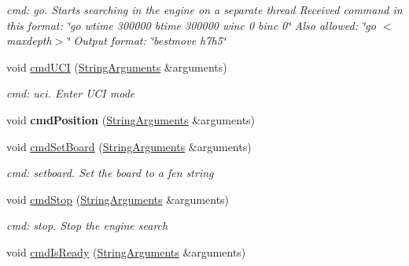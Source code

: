 \begin{DoxyCompactItemize}
\begin{DoxyCompactList}\small\item\em cmd\+: go. Starts searching in the engine on a separate thread Received command in this format\+: \char`\"{}go wtime 300000 btime 300000 winc 0 binc 0\char`\"{} Also allowed\+: \char`\"{}go $<$maxdepth$>$\char`\"{} Output format\+: \char`\"{}bestmove h7h5\char`\"{} \end{DoxyCompactList}\item 
\mbox{\label{classCommandEngine_a60549918b43f3e5a3a9c046dcd3b74bb}} 
void \hyperlink{classCommandEngine_a60549918b43f3e5a3a9c046dcd3b74bb}{cmd\+U\+CI} (\hyperlink{structStringArguments}{String\+Arguments} \&arguments)
\begin{DoxyCompactList}\small\item\em cmd\+: uci. Enter U\+CI mode \end{DoxyCompactList}\item 
\mbox{\label{classCommandEngine_a0a3ff3017005a6cbd5f347def93df769}} 
void {\bfseries cmd\+Position} (\hyperlink{structStringArguments}{String\+Arguments} \&arguments)
\item 
\mbox{\label{classCommandEngine_a2db9a6317c944a436cc57d686b82e317}} 
void \hyperlink{classCommandEngine_a2db9a6317c944a436cc57d686b82e317}{cmd\+Set\+Board} (\hyperlink{structStringArguments}{String\+Arguments} \&arguments)
\begin{DoxyCompactList}\small\item\em cmd\+: setboard. Set the board to a fen string \end{DoxyCompactList}\item 
\mbox{\label{classCommandEngine_a93c928fa42978803696d94d6e2ab4e40}} 
void \hyperlink{classCommandEngine_a93c928fa42978803696d94d6e2ab4e40}{cmd\+Stop} (\hyperlink{structStringArguments}{String\+Arguments} \&arguments)
\begin{DoxyCompactList}\small\item\em cmd\+: stop. Stop the engine search \end{DoxyCompactList}\item 
\mbox{\label{classCommandEngine_ad9bf2d5479c8d9c15713f51101676860}} 
void \hyperlink{classCommandEngine_ad9bf2d5479c8d9c15713f51101676860}{cmd\+Is\+Ready} (\hyperlink{structStringArguments}{String\+Arguments} \&arguments)

\end{DoxyCompactItemize}
